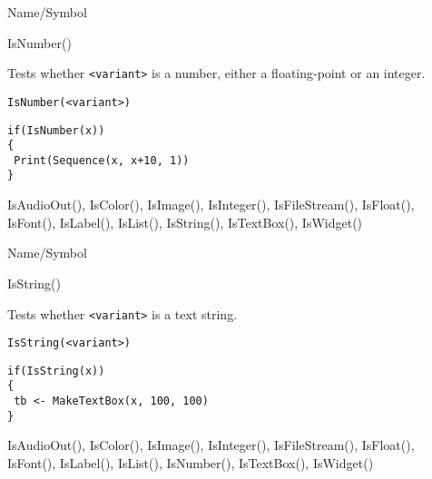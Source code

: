 \rl


\begin{desc}{Name/Symbol}
\item[Name/Symbol]	IsNumber()

\item[Description]	Tests whether \verb+<variant>+ is a number, either a
		floating-point or an integer.

\item[Usage]		
\begin{verbatim}
IsNumber(<variant>)
\end{verbatim}

\item[Example]	
\begin{verbatim}
if(IsNumber(x))
{
 Print(Sequence(x, x+10, 1))
}
\end{verbatim}

\item[See Also]		IsAudioOut(), IsColor(), IsImage(), IsInteger(), IsFileStream(), IsFloat(), IsFont(), IsLabel(),
 	   	IsList(), IsString(), IsTextBox(), IsWidget()
\end{desc}

\rl




\begin{desc}{Name/Symbol}
\item[Name/Symbol]	IsString()

\item[Description]	Tests whether \verb+<variant>+ is a text string.

\item[Usage]		
\begin{verbatim}
IsString(<variant>)
\end{verbatim}

\item[Example]	
\begin{verbatim}
if(IsString(x))
{
 tb <- MakeTextBox(x, 100, 100)
}
\end{verbatim}

\item[See Also]	IsAudioOut(), IsColor(), IsImage(), IsInteger(), 
		IsFileStream(), IsFloat(), IsFont(), IsLabel(),
		IsList(), IsNumber(), IsTextBox(), IsWidget()
\end{desc}

\rl




